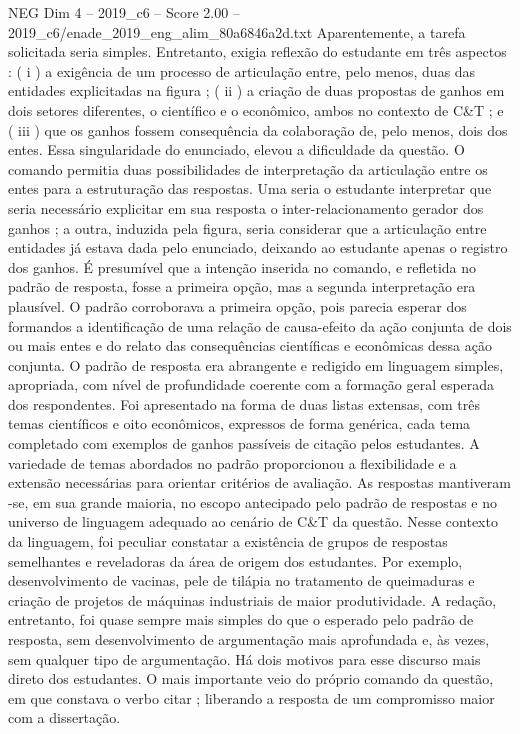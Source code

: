 \begin{textsample}{NEG Dim 4 – 2019\_c6 – Score 2.00 – 2019\_c6/enade\_2019\_eng\_alim\_80a6846a2d.txt}
Aparentemente, a tarefa solicitada seria simples.
Entretanto, exigia reflexão do estudante em três aspectos : ( i ) a exigência de um processo de articulação entre, pelo menos, duas das entidades explicitadas na figura ; ( ii ) a criação de duas propostas de ganhos em dois setores diferentes, o científico e o econômico, ambos no contexto de C\&T ; e ( iii ) que os ganhos fossem consequência da colaboração de, pelo menos, dois dos entes.
Essa singularidade do enunciado, elevou a dificuldade da questão.
O comando permitia duas possibilidades de interpretação da articulação entre os entes para a estruturação das respostas.
Uma seria o estudante interpretar que seria necessário explicitar em sua resposta o inter-relacionamento gerador dos ganhos ; a outra, induzida pela figura, seria considerar que a articulação entre entidades já estava dada pelo enunciado, deixando ao estudante apenas o registro dos ganhos.
É presumível que a intenção inserida no comando, e refletida no padrão de resposta, fosse a primeira opção, mas a segunda interpretação era plausível.
O padrão corroborava a primeira opção, pois parecia esperar dos formandos a identificação de uma relação de causa-efeito da ação conjunta de dois ou mais entes e do relato das consequências científicas e econômicas dessa ação conjunta.
O padrão de resposta era abrangente e redigido em linguagem simples, apropriada, com nível de profundidade coerente com a formação geral esperada dos respondentes.
Foi apresentado na forma de duas listas extensas, com três temas científicos e oito econômicos, expressos de forma genérica, cada tema completado com exemplos de ganhos passíveis de citação pelos estudantes.
A variedade de temas abordados no padrão proporcionou a flexibilidade e a extensão necessárias para orientar critérios de avaliação.
As respostas mantiveram -se, em sua grande maioria, no escopo antecipado pelo padrão de respostas e no universo de linguagem adequado ao cenário de C\&T da questão.
Nesse contexto da linguagem, foi peculiar constatar a existência de grupos de respostas semelhantes e reveladoras da área de origem dos estudantes.
Por exemplo, desenvolvimento de vacinas, pele de tilápia no tratamento de queimaduras e criação de projetos de máquinas industriais de maior produtividade.
A redação, entretanto, foi quase sempre mais simples do que o esperado pelo padrão de resposta, sem desenvolvimento de argumentação mais aprofundada e, às vezes, sem qualquer tipo de argumentação.
Há dois motivos para esse discurso mais direto dos estudantes.
O mais importante veio do próprio comando da questão, em que constava o verbo citar ; liberando a resposta de um compromisso maior com a dissertação.

\end{textsample}
